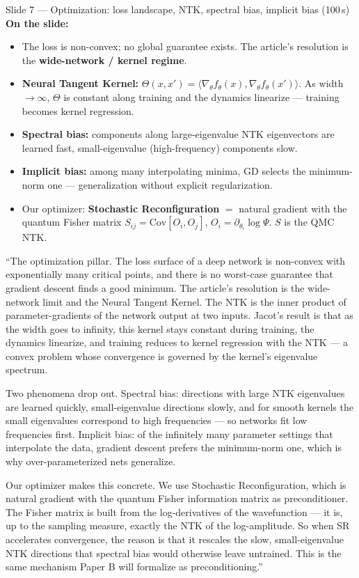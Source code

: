 \documentclass[11pt]{article}
\begin{document}
\begin{slide}{Slide 7 --- Optimization: loss landscape, NTK, spectral bias, implicit bias (100\,s)}
\textbf{On the slide:}
\begin{itemize}[leftmargin=*]
\item The loss is non-convex; no global guarantee exists. The article's resolution is the
\textbf{wide-network / kernel regime}.
\item \textbf{Neural Tangent Kernel:} $\Theta(x,x')=\langle\nabla_\theta f_\theta(x),
\nabla_\theta f_\theta(x')\rangle$. As width $\to\infty$, $\Theta$ is constant along training and the
dynamics linearize --- training becomes kernel regression.
\item \textbf{Spectral bias:} components along large-eigenvalue NTK eigenvectors are learned fast,
small-eigenvalue (high-frequency) components slow.
\item \textbf{Implicit bias:} among many interpolating minima, GD selects the minimum-norm one ---
generalization without explicit regularization.
\item Our optimizer: \textbf{Stochastic Reconfiguration} $=$ natural gradient with the quantum Fisher
matrix $S_{ij}=\mathrm{Cov}[O_i,O_j]$, $O_i=\partial_{\theta_i}\log\Psi$. $S$ is the QMC NTK.
\end{itemize}
\end{slide}

\begin{say}
``The optimization pillar. The loss surface of a deep network is non-convex with exponentially many
critical points, and there is no worst-case guarantee that gradient descent finds a good minimum.
The article's resolution is the wide-network limit and the Neural Tangent Kernel. The NTK is the
inner product of parameter-gradients of the network output at two inputs. Jacot's result is that as
the width goes to infinity, this kernel stays constant during training, the dynamics linearize, and
training reduces to kernel regression with the NTK --- a convex problem whose convergence is governed
by the kernel's eigenvalue spectrum.

Two phenomena drop out. Spectral bias: directions with large NTK eigenvalues are learned quickly,
small-eigenvalue directions slowly, and for smooth kernels the small eigenvalues correspond to high
frequencies --- so networks fit low frequencies first. Implicit bias: of the infinitely many
parameter settings that interpolate the data, gradient descent prefers the minimum-norm one, which
is why over-parameterized nets generalize.

Our optimizer makes this concrete. We use Stochastic Reconfiguration, which is natural gradient with
the quantum Fisher information matrix as preconditioner. The Fisher matrix is built from the
log-derivatives of the wavefunction --- it is, up to the sampling measure, exactly the NTK of the
log-amplitude. So when SR accelerates convergence, the reason is that it rescales the slow,
small-eigenvalue NTK directions that spectral bias would otherwise leave untrained. This is the same
mechanism Paper B will formalize as preconditioning.''
\end{say}
\end{document}

